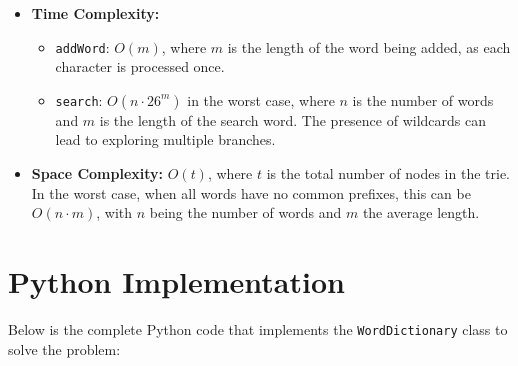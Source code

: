\begin{itemize}
    \item \textbf{Time Complexity:}
    \begin{itemize}
        \item \texttt{addWord}: \(O(m)\), where \(m\) is the length of the word being added, as each character is processed once.
        \item \texttt{search}: \(O(n \cdot 26^m)\) in the worst case, where \(n\) is the number of words and \(m\) is the length of the search word. The presence of wildcards can lead to exploring multiple branches.
    \end{itemize}
    \item \textbf{Space Complexity:} \(O(t)\), where \(t\) is the total number of nodes in the trie. In the worst case, when all words have no common prefixes, this can be \(O(n \cdot m)\), with \(n\) being the number of words and \(m\) the average length.
\end{itemize}

\section*{Python Implementation}


Below is the complete Python code that implements the \texttt{WordDictionary} class to solve the problem:

